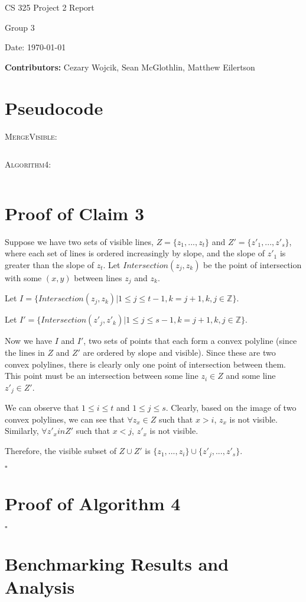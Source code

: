 \documentclass[12pt,letterpaper]{article}
\begin{document}
\begin{titlepage}
    \vspace*{4cm}
    {\huge \center
        CS 325 Project 2 Report\\[1cm]
    }
    \center
    {\large
        Group 3

        Date: \today

    \textbf{Contributors:}
    Cezary Wojcik,
    Sean McGlothlin,
    Matthew Eilertson
    }

\end{titlepage}

\section{Pseudocode}

\textsc{MergeVisible:}
\begin{verbatim}
\end{verbatim}

\textsc{Algorithm4:}
\begin{verbatim}
\end{verbatim}

\section{Proof of Claim 3}

Suppose we have two sets of visible lines, $Z = \{ z_1, ..., z_t \}$ and $Z' = \{ z'_1, ..., z'_s \}$, where each set of lines is ordered increasingly by slope, and the slope of $z'_1$ is greater than the slope of $z_t$. Let $Intersection(z_j, z_k)$ be the point of intersection with some $(x, y)$ between lines $z_j$ and $z_k$. 

Let $I  = \{ Intersection(z_j, z_k) | 1 \leq j \leq t - 1, k = j + 1, k, j \in \mathbb{Z} \}$.

Let $I' = \{ Intersection(z'_j, z'_k) | 1 \leq j \leq s - 1, k = j + 1, k, j \in \mathbb{Z}  \}$.

Now we have $I$ and $I'$, two sets of points that each form a convex polyline (since the lines in $Z$ and $Z'$ are ordered by slope and visible). Since these are two convex polylines, there is clearly only one point of intersection between them. This point must be an intersection between some line $z_i \in Z$ and some line $z'_j \in Z'$.

We can observe that $1 \leq i \leq t$ and $1 \leq j \leq s$. Clearly, based on the image of two convex polylines, we can see that $\forall z_x \in Z$ such that $x > i$, $z_x$ is not visible. Similarly, $\forall z'_x in Z'$ such that $x < j$, $z'_x$ is not visible.

Therefore, the visible subset of $Z \cup Z'$ is $\{z_1, ..., z_i \} \cup \{ z'_j, ..., z'_s \}$.

$\square$

\section{Proof of Algorithm 4}

$\square$

\section{Benchmarking Results and Analysis}
\end{document}
